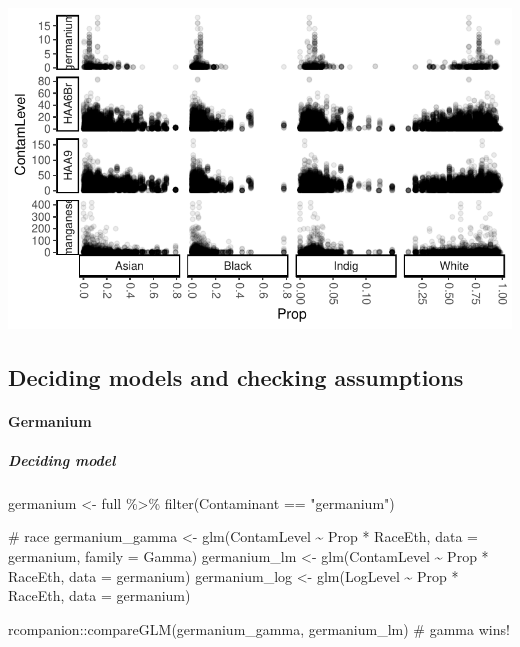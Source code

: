 \documentclass[
  letterpaper,
  DIV=11,
  numbers=noendperiod]{scrartcl}
\let\oldparagraph\paragraph
\renewcommand{\paragraph}[1]{\oldparagraph{#1}\mbox{}}
\let\oldsubparagraph\subparagraph
\renewcommand{\subparagraph}[1]{\oldsubparagraph{#1}\mbox{}}
\newenvironment{Shaded}{\begin{snugshade}}{\end{snugshade}}
\newcommand{\AttributeTok}[1]{\textcolor[rgb]{0.40,0.45,0.13}{#1}}
\newcommand{\CommentTok}[1]{\textcolor[rgb]{0.37,0.37,0.37}{#1}}
\newcommand{\FunctionTok}[1]{\textcolor[rgb]{0.28,0.35,0.67}{#1}}
\newcommand{\NormalTok}[1]{\textcolor[rgb]{0.00,0.23,0.31}{#1}}
\newcommand{\OtherTok}[1]{\textcolor[rgb]{0.00,0.23,0.31}{#1}}
\newcommand{\SpecialCharTok}[1]{\textcolor[rgb]{0.37,0.37,0.37}{#1}}
\newcommand{\StringTok}[1]{\textcolor[rgb]{0.13,0.47,0.30}{#1}}
\begin{document}
\includegraphics{appendix_files/figure-pdf/plotting contams and race/eth-1.pdf}

\hypertarget{deciding-models-and-checking-assumptions}{%
\subsection{Deciding models and checking
assumptions}\label{deciding-models-and-checking-assumptions}}

\hypertarget{germanium}{%
\paragraph{Germanium}\label{germanium}}

\hypertarget{deciding-model}{%
\subparagraph{Deciding model}\label{deciding-model}}

\begin{Shaded}
\begin{Highlighting}[]
\NormalTok{germanium }\OtherTok{\textless{}{-}}\NormalTok{ full }\SpecialCharTok{\%\textgreater{}\%} 
  \FunctionTok{filter}\NormalTok{(Contaminant }\SpecialCharTok{==} \StringTok{"germanium"}\NormalTok{)}

\CommentTok{\# race}
\NormalTok{germanium\_gamma }\OtherTok{\textless{}{-}} \FunctionTok{glm}\NormalTok{(ContamLevel }\SpecialCharTok{\textasciitilde{}}\NormalTok{ Prop }\SpecialCharTok{*}\NormalTok{ RaceEth, }\AttributeTok{data =}\NormalTok{ germanium, }\AttributeTok{family =}\NormalTok{ Gamma)}
\NormalTok{germanium\_lm }\OtherTok{\textless{}{-}} \FunctionTok{glm}\NormalTok{(ContamLevel }\SpecialCharTok{\textasciitilde{}}\NormalTok{ Prop }\SpecialCharTok{*}\NormalTok{ RaceEth, }\AttributeTok{data =}\NormalTok{ germanium)}
\NormalTok{germanium\_log }\OtherTok{\textless{}{-}} \FunctionTok{glm}\NormalTok{(LogLevel }\SpecialCharTok{\textasciitilde{}}\NormalTok{ Prop }\SpecialCharTok{*}\NormalTok{ RaceEth, }\AttributeTok{data =}\NormalTok{ germanium)}

\NormalTok{rcompanion}\SpecialCharTok{::}\FunctionTok{compareGLM}\NormalTok{(germanium\_gamma, germanium\_lm) }\CommentTok{\# gamma wins!}
\end{Highlighting}
\end{Shaded}
\end{document}
